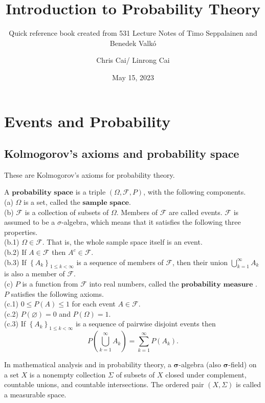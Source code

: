 \documentclass[11pt]{elegantbook}
\title{Introduction to Probability Theory}
\subtitle{Quick reference book created from 531 Lecture Notes of Timo Seppalainen and Benedek Valkó}
\author{Chris Cai/ Linrong Cai}
\institute{University of Wisconisn Madison}
\date{May 15, 2023}
\begin{document}
\maketitle

\frontmatter
\tableofcontents

\mainmatter

\chapter{Events and Probability}

\section{Kolmogorov's axioms and probability space}

These are Kolmogorov's axioms for probability theory.
\begin{definition}
A $\textbf{probability space}$ is a triple $(\Omega, \mathcal{F}, P)$, with the following components. \\
(a) $\Omega$ is a set, called the $\textbf{sample space}$. \\ 
(b) $\mathcal{F}$ is a collection of subsets of $\Omega$. Members of $\mathcal{F}$ are called events. $\mathcal{F}$ is assumed to be a $\sigma$-algebra, which means that it satisfies the following three properties.\\
(b.1) $\Omega \in \mathcal{F}$. That is, the whole sample space itself is an event.\\
(b.2) If $A \in \mathcal{F}$ then $A^c \in \mathcal{F}$.\\
(b.3) If $\left\{A_k\right\}_{1 \leq k<\infty}$ is a sequence of members of $\mathcal{F}$, then their union $\bigcup_{k=1}^{\infty} A_k$ is also a member of $\mathcal{F}$.\\
(c) $P$ is a function from $\mathcal{F}$ into real numbers, called the $\textbf{probability measure}$ . $P$ satisfies the following axioms.\\
(c.1) $0 \leq P(A) \leq 1$ for each event $A \in \mathcal{F}$.\\
(c.2) $P(\varnothing)=0$ and $P(\Omega)=1$.\\
(c.3) If $\left\{A_k\right\}_{1 \leq k<\infty}$ is a sequence of pairwise disjoint events then
$$
P\left(\bigcup_{k=1}^{\infty} A_k\right)=\sum_{k=1}^{\infty} P\left(A_k\right) .
$$
\end{definition}

\begin{note}
    In mathematical analysis and in probability theory, a $\boldsymbol{\sigma}$-algebra (also $\boldsymbol{\sigma}$-field) on a set $X$ is a nonempty collection $\Sigma$ of subsets of $X$ closed under complement, countable unions, and countable intersections. The ordered pair $(X, \Sigma)$ is called a measurable space.
\end{note}
\end{document}
